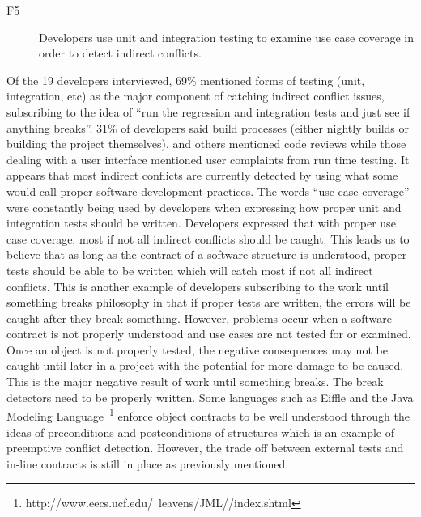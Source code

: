 \documentclass[conference]{IEEEtran}
\makeatletter
\def\namedlabel#1#2{\begingroup
   \def\@currentlabel{#2}%
   \label{#1}\endgroup
}
\makeatother
\begin{document}
\begin{description}
	\item[F5\namedlabel{itm:f5}{F5}] Developers use unit and integration testing to examine use case coverage in order to detect indirect conflicts.
\end{description}

Of the 19 developers interviewed, 69\% mentioned forms of testing (unit, integration, etc) as the major component of catching indirect
conflict issues, subscribing to the idea of ``run the regression and integration tests and just see if anything breaks''. 31\% of developers 
said build processes (either nightly builds or building the project themselves), and others mentioned code reviews
while those dealing with a user interface mentioned user complaints from run time testing. It appears that most indirect conflicts are currently
detected by using what some would call proper software development practices. The words ``use case coverage'' were constantly being used by developers
when expressing how proper unit and integration tests should be written. Developers expressed that with proper use case coverage, most if
not all indirect conflicts should be caught. This leads us to believe that as long as the contract of a software structure is understood,
proper tests should be able to be written which will catch most if not all indirect conflicts. This is another example of developers subscribing
to the work until something breaks philosophy in that if proper tests are written, the errors will be caught after they break something.
However, problems occur when a software contract is
not properly understood and use cases are not tested for or examined. Once an object is not properly
tested, the negative consequences may not be caught until later in a project with the potential for more damage to be caused. This is the major
negative result of work until something breaks. The break detectors need to be properly written. Some languages
such as Eiffle and the Java Modeling Language~\footnote{http://www.eecs.ucf.edu/~leavens/JML//index.shtml}
enforce object contracts to be well understood through the ideas of preconditions and postconditions of structures which is an example of preemptive
conflict detection. However, the trade off between external tests and in-line contracts is still in place as previously mentioned.
\end{document}
